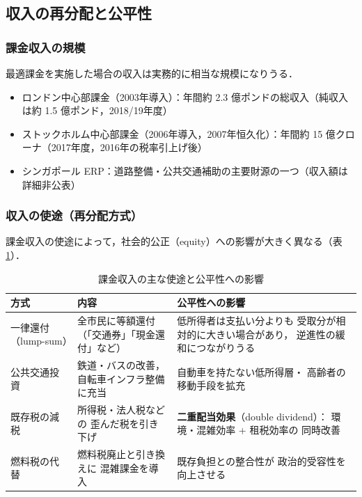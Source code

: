 \subsection{収入の再分配と公平性}
\label{subsec:redistribution}

\subsubsection*{課金収入の規模}

最適課金を実施した場合の収入は実務的に相当な規模になりうる．

\begin{itemize}
  \item ロンドン中心部課金（2003年導入）：年間約 2.3 億ポンドの総収入（純収入は約 1.5 億ポンド，2018/19年度）
  \item ストックホルム中心部課金（2006年導入，2007年恒久化）：年間約 15 億クローナ（2017年度，2016年の税率引上げ後）
  \item シンガポール ERP：道路整備・公共交通補助の主要財源の一つ（収入額は詳細非公表）
\end{itemize}

\subsubsection*{収入の使途（再分配方式）}

課金収入の使途によって，社会的公正（equity）への影響が大きく異なる（表\ref{tab:revenue-use}）．

\begin{table}[hbtp]
  \centering
  \caption{課金収入の主な使途と公平性への影響}
  \label{tab:revenue-use}
  \begin{tabular}{p{3.5cm}p{5.5cm}p{4.5cm}}
    \toprule
    方式 & 内容 & 公平性への影響 \\
    \midrule
    一律還付（lump-sum） &
      全市民に等額還付
      （「交通券」「現金還付」など） &
      低所得者は支払い分よりも
      受取分が相対的に大きい場合があり，
      逆進性の緩和につながりうる \\[4pt]
    公共交通投資 &
      鉄道・バスの改善，
      自転車インフラ整備に充当 &
      自動車を持たない低所得層・
      高齢者の移動手段を拡充 \\[4pt]
    既存税の減税 &
      所得税・法人税などの
      歪んだ税を引き下げ &
      \textbf{二重配当効果}（double dividend）：
      環境・混雑効率 + 租税効率の
      同時改善 \\[4pt]
    燃料税の代替 &
      燃料税廃止と引き換えに
      混雑課金を導入 &
      既存負担との整合性が
      政治的受容性を向上させる \\
    \bottomrule
  \end{tabular}
\end{table}

